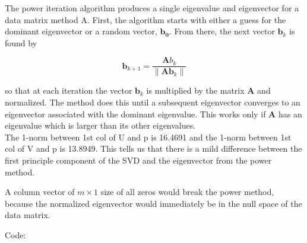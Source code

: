 \documentclass{article}
\begin{document}
\begin{homeworkProblem}
    
    The power iteration algorithm produces a single eigenvalue and eigenvector
    for a data matrix method A. First, the algorithm starts with either a guess
    for the dominant eigenvector or a random vector, $\bm{b_0}$. From there,
    the next vector $\bm{b}_k$ is found by 

    \begin{equation}
        \bm{b}_{k+1} = \frac{\bm{A}{b}_k}{\|\bm{A}\bm{b}_k\|}
    \end{equation}

    \noindent so that at each iteration the vector $\bm{b}_k$ is multiplied by
    the matrix $\bm{A}$ and normalized. The method does this until a subsequent
    eigenvector converges to an eigenvector associated with the dominant
    eigenvalue. This works only if $\bm{A}$ has an eigenvalue which is larger
    than its other eigenvalues. \\

    The 1-norm between 1st col of U and p is 16.4691 and the 1-norm between
    1st col of V and p is 13.8949. This tells us that there is a mild
    difference between the first principle component of the SVD and the
    eigenvector from the power method.

\end{homeworkProblem}

\begin{homeworkProblem}

    A column vector of $m \times 1$ size of all zeros would break the power
    method, because the normalized eigenvector would immediately be in the null
    space of the data matrix.

\end{homeworkProblem}
\clearpage

Code:
\end{document}
